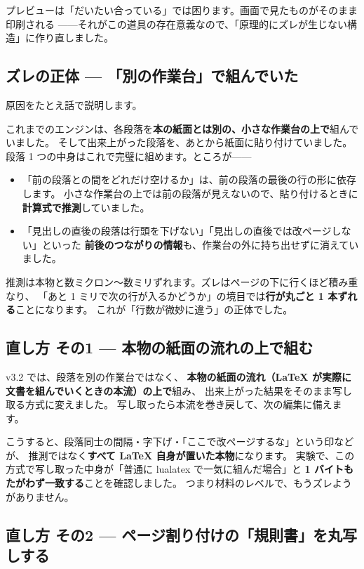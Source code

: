 \documentclass[11pt,a4paper]{ltjsarticle}
\begin{document}
プレビューは「だいたい合っている」では困ります。画面で見たものがそのまま印刷される
——それがこの道具の存在意義なので、「原理的にズレが生じない構造」に作り直しました。

\subsection{ズレの正体 --- 「別の作業台」で組んでいた}

原因をたとえ話で説明します。

これまでのエンジンは、各段落を\textbf{本の紙面とは別の、小さな作業台の上で}組んでいました。
そして出来上がった段落を、あとから紙面に貼り付けていました。
段落 1 つの中身はこれで完璧に組めます。ところが——

\begin{itemize}
\item 「前の段落との間をどれだけ空けるか」は、前の段落の最後の行の形に依存します。
  小さな作業台の上では前の段落が見えないので、貼り付けるときに\textbf{計算式で推測}していました。
\item 「見出しの直後の段落は行頭を下げない」「見出しの直後では改ページしない」といった
  \textbf{前後のつながりの情報}も、作業台の外に持ち出せずに消えていました。
\end{itemize}

推測は本物と数ミクロン〜数ミリずれます。ズレはページの下に行くほど積み重なり、
「あと 1 ミリで次の行が入るかどうか」の境目では\textbf{行が丸ごと 1 本ずれる}ことになります。
これが「行数が微妙に違う」の正体でした。

\subsection{直し方 その1 --- 本物の紙面の流れの上で組む}

v3.2 では、段落を別の作業台ではなく、
\textbf{本物の紙面の流れ（LaTeX が実際に文書を組んでいくときの本流）の上で}組み、
出来上がった結果をそのまま写し取る方式に変えました。
写し取ったら本流を巻き戻して、次の編集に備えます。

こうすると、段落同士の間隔・字下げ・「ここで改ページするな」という印などが、
推測ではなく\textbf{すべて LaTeX 自身が置いた本物}になります。
実験で、この方式で写し取った中身が「普通に lualatex で一気に組んだ場合」と
\textbf{1 バイトもたがわず一致する}ことを確認しました。
つまり材料のレベルで、もうズレようがありません。

\subsection{直し方 その2 --- ページ割り付けの「規則書」を丸写しする}
\end{document}
